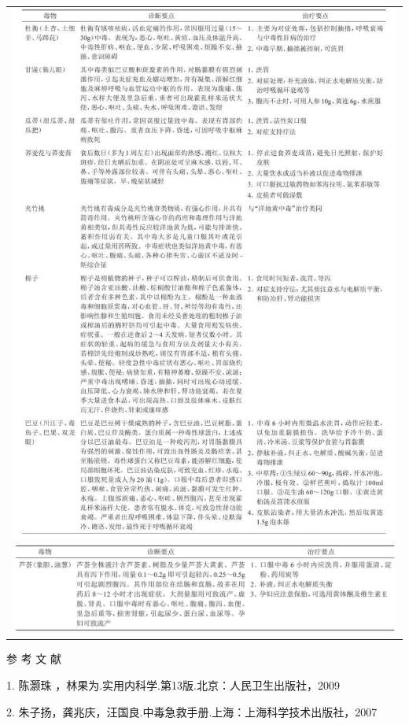 \begin{longtable}{c}
 \includegraphics[width=\textwidth,height=\textheight,keepaspectratio]{./images/Image00226.jpg}\\
 \includegraphics[width=\textwidth,height=\textheight,keepaspectratio]{./images/Image00227.jpg}
 \end{longtable}


\protect\hypertarget{text00171.html}{}{}

\hypertarget{text00171.htmlux5cux23CHP5-7-10}{}
参 考 文 献

1. 陈灏珠 ，林果为.实用内科学.第13版.北京：人民卫生出版社，2009

2. 朱子扬，龚兆庆，汪国良.中毒急救手册.上海：上海科学技术出版社，2007


